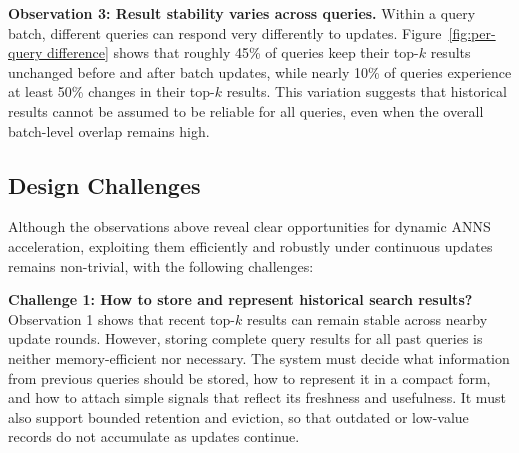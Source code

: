 
\noindent\textbf{Observation 3: Result stability varies across queries.}
Within a query batch, different queries can respond very differently to updates. Figure~\ref{fig:per-query difference} shows that roughly 45\% of queries keep
their top-$k$ results unchanged before and after batch updates, while nearly 10\% of queries experience at least 50\% changes in their top-$k$ results. This variation suggests that historical results cannot be assumed to be reliable for all queries, even when the overall batch-level overlap remains high.


\subsection{Design Challenges}

Although the observations above reveal clear opportunities for dynamic ANNS acceleration, exploiting them efficiently and robustly under continuous updates remains non-trivial,
with the following challenges:

\noindent\textbf{Challenge 1: How to store and represent historical search results?}
Observation 1 shows that recent top-$k$ results can remain stable across nearby update rounds.
However, storing complete query results for all past queries is neither memory-efficient nor necessary.
The system must decide what information from previous queries should be stored, how to represent it in a compact form, and how to attach simple signals that reflect its freshness and usefulness.
It must also support bounded retention and eviction, so that outdated or low-value records do not accumulate as updates continue.









